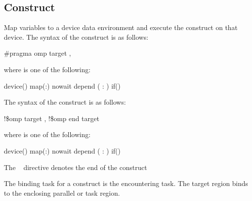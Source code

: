 \subsection{ Construct}
\label{subsec:target Construct}
\summary
Map variables to a device data environment and execute the construct on that device.
\syntax
\ccppspecificstart
The syntax of the  construct is as follows:

\begin{boxedcode}
\#pragma omp target \plc{[clause[ [},\plc{] clause] ... ] new-line}
\end{boxedcode}

where  is one of the following:

\begin{indentedcodelist}
device()
map(\plc{[[map-type-modifier[,]] map-type}:\plc{ ] list})
nowait
depend ( : )
if()
\end{indentedcodelist}
\ccppspecificend

\begin{samepage}
\smallskip
\fortranspecificstart
The syntax of the  construct is as follows:

\begin{boxedcode}
!\$omp target \plc{[clause[ [},\plc{] clause] ... ]}
!\$omp end target
\end{boxedcode}
\end{samepage}

\begin{samepage}
where  is one of the following:

\begin{indentedcodelist}
device()
map(\plc{[[map-type-modifier[,]] map-type}:\plc{ ] list})
nowait
depend ( : )
if()
\end{indentedcodelist}
\end{samepage}

The ~ directive denotes the end of the  construct
\fortranspecificend

\binding
The binding task for a  construct is the encountering task. The target region 
binds to the enclosing parallel or task region.

